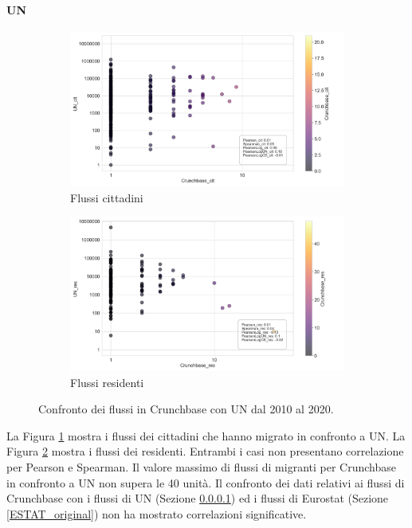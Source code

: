 \paragraph{UN}
\label{UN_original}

\begin{figure}[tb]
    \centering
    \begin{subfigure}{\textwidth}
        \centering
        \includegraphics[width=1.0\textwidth]{images/flows/original/UN_cit_False.png}
        \caption{Flussi cittadini}
        \label{fig:uncrunchfalse_cit}
    \end{subfigure}
    \begin{subfigure}{\textwidth}
        \includegraphics[width=1.0\textwidth]{images/flows/original/UN_res_False.png}
        \caption{Flussi residenti}
        \label{fig:uncrunchfalse_res}
    \end{subfigure}
    \caption{Confronto dei flussi in Crunchbase con UN dal 2010 al 2020.}
    \label{fig:uncrunchfalse}
\end{figure}
La Figura \ref{fig:uncrunchfalse_cit} mostra i flussi dei cittadini che hanno migrato in confronto a UN. La Figura \ref{fig:uncrunchfalse_res} mostra i flussi dei residenti. Entrambi i casi non presentano correlazione per Pearson e Spearman. Il valore massimo di flussi di migranti per Crunchbase in confronto a UN non supera le 40 unità. 
Il confronto dei dati relativi ai flussi di Crunchbase con i flussi di UN (Sezione \ref{UN_original}) ed i flussi di Eurostat (Sezione \ref{ESTAT_original}) non ha mostrato correlazioni significative.
\FloatBarrier

